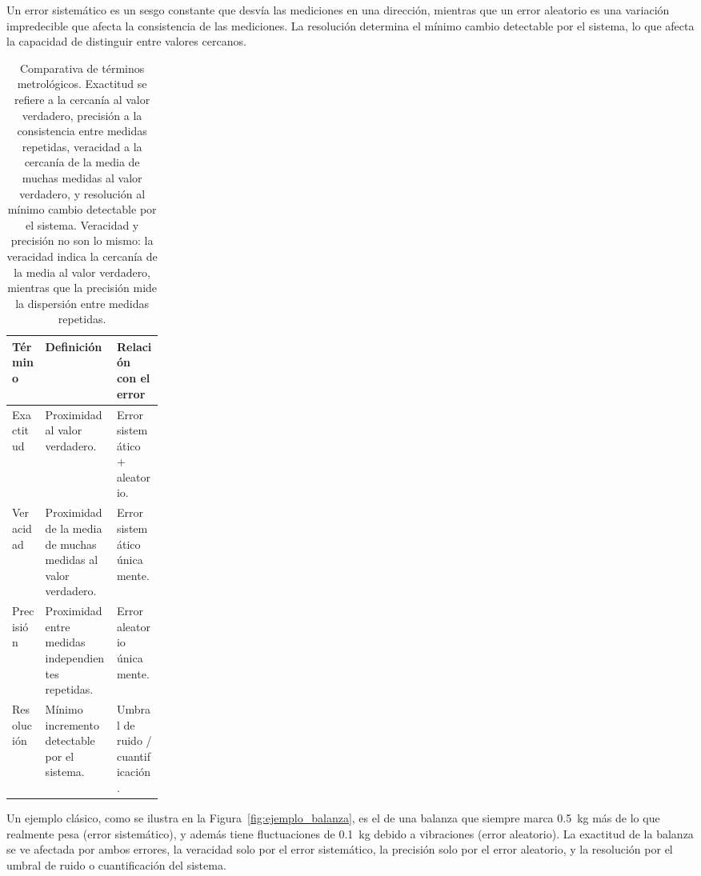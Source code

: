 Un error sistemático es un sesgo constante que desvía las mediciones en una dirección, mientras que un error aleatorio es una variación impredecible que afecta la consistencia de las mediciones. La resolución determina el mínimo cambio detectable por el sistema, lo que afecta la capacidad de distinguir entre valores cercanos.

\begin{table}[!htbp]
    \centering
    \small
    \caption[Comparativa de términos metrológicos]{Comparativa de términos metrológicos. Exactitud se refiere a la cercanía al valor verdadero, precisión a la consistencia entre medidas repetidas, veracidad a la cercanía de la media de muchas medidas al valor verdadero, y resolución al mínimo cambio detectable por el sistema. Veracidad y precisión no son lo mismo: la veracidad indica la cercanía de la media al valor verdadero, mientras que la precisión mide la dispersión entre medidas repetidas. \protect\label{tab:terminos_metrologicos}}
    \setlength{\tabcolsep}{4pt}
    \begin{tabularx}{\linewidth}{L{0.22\linewidth}X X}
        \toprule
        \textbf{Término} & \textbf{Definición} & \textbf{Relación con el error} \\
        \midrule
        Exactitud & Proximidad al valor verdadero. & Error sistemático + aleatorio. \\
        Veracidad & Proximidad de la media de muchas medidas al valor verdadero. & Error sistemático únicamente. \\
        Precisión & Proximidad entre medidas independientes repetidas. & Error aleatorio únicamente. \\
        Resolución & Mínimo incremento detectable por el sistema. & Umbral de ruido / cuantificación. \\
        \bottomrule
    \end{tabularx}
\end{table}

Un ejemplo clásico, como se ilustra en la Figura~\ref{fig:ejemplo_balanza}, es el de una balanza que siempre marca \SI{0.5}{kg} más de lo que realmente pesa (error sistemático), y además tiene fluctuaciones de \SI{0.1}{kg} debido a vibraciones (error aleatorio). La exactitud de la balanza se ve afectada por ambos errores, la veracidad solo por el error sistemático, la precisión solo por el error aleatorio, y la resolución por el umbral de ruido o cuantificación del sistema.

